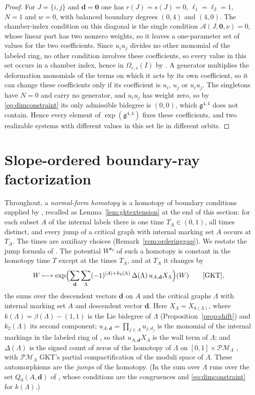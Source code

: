 \documentclass[11pt]{amsart}
\theoremstyle{definition}
\theoremstyle{remark}
\newcommand{\gfrak}{\mathfrak{g}}
\newcommand{\Ascr}{\mathcal{A}}
\newcommand{\Om}{\Omega_{r,s}}
\begin{document}
\begin{proof}
For $J=\{i,j\}$ and $\mathbf d=\mathbf 0$ one has $r(J)=s(J)=0$,
$\ell_1=\ell_2=1$, $N=1$ and $w=0$, with balanced boundary degrees $(0,4)$ and
$(4,0)$.  The chamber-index condition on this diagonal is the single condition
$\Ascr(J,\mathbf 0,\nu)=0$, whose linear part has two nonzero weights, so it
leaves a one-parameter set of values for the two coefficients.  Since
$u_iu_j$ divides no other monomial of the labeled ring, no other condition
involves these coefficients, so every value in this set occurs in a chamber index, hence
in $\Om(I)$ by \cite[Cor.~5.14]{GKT}.  A generator multiplies the deformation
monomials of the terms on which it acts by its own coefficient, so it can
change these coefficients only if its coefficient is $u_i$, $u_j$ or
$u_iu_j$.  The singletons have $N=0$ and carry no generator, and $u_iu_j$ has
weight zero, so by \eqref{eq:dimconstraint} its only admissible bidegree is
$(0,0)$, which $\gfrak^{4,4}$ does not contain.  Hence every element of
$\exp(\gfrak^{4,4})$ fixes these coefficients, and two realizable systems with
different values in this set lie in different orbits.
\end{proof}

\section{Slope-ordered boundary-ray factorization}
\label{sec:presentation}

Throughout, a \emph{normal-form homotopy} is a homotopy of boundary
conditions supplied by \cite[Lem.~3.40]{GKT}, recalled as
Lemma~\ref{lem:gktextension} at the end of this section: for each subset $A$ of the
internal labels there is one time $T_{A}\in(0,1)$, all times distinct, and
every jump of a critical graph with internal marking set $A$ occurs at
$T_{A}$. The times are auxiliary choices (Remark~\ref{rem:orderinggap}).
We restate the jump formula of \cite[proof of Thm.~5.9]{GKT}.  The potential
$W^{\mathfrak s_T}$ of such a homotopy is constant in the homotopy time $T$ except at the times $T_A$,
and at $T_A$ it changes by
\[
W\longmapsto\exp\Bigl(\sum_{\mathbf d}\sum_{\Lambda}
(-1)^{|A|+k_2(\Lambda)}\,\Delta(\Lambda)\,u_{A,\mathbf d}X_{\Lambda}\Bigr)(W)
\qquad\text{\cite[proof of Thm.~5.9]{GKT}},
\]
the sums over the descendent vectors $\mathbf d$ on $A$ and the critical graphs
$\Lambda$ with internal marking set $A$ and descendent vector $\mathbf d$.
Here $X_\Lambda=X_{k(\Lambda)}$, where $k(\Lambda)=\beta(\Lambda)-(1,1)$ is the
Lie bidegree of $\Lambda$ (Proposition~\ref{prop:shift}) and $k_2(\Lambda)$ its
second component; $u_{A,\mathbf d}=\prod_{j\in A}u_{j,d_j}$ is the monomial of
the internal markings in the labeled ring of \cite[Def.~4.6]{GKT}, so that
$u_{A,\mathbf d}X_\Lambda$ is the wall term of $\Lambda$; and $\Delta(\Lambda)$ is
the signed count of zeros of the homotopy of
$\Lambda$ on $[0,1]\times\mathcal{PM}_\Lambda$ \cite[(5.33)]{GKT}, with
$\mathcal{PM}_\Lambda$ GKT's partial compactification of the moduli space of
$\Lambda$.  These
automorphisms are the \emph{jumps} of the homotopy.  (In \cite{GKT} the sum
over $\Lambda$ runs over the set $Q_0(A,\mathbf d)$ of \cite[Not.~5.7]{GKT},
whose conditions are the congruences and \eqref{eq:dimconstraint} for
$k(\Lambda)$.)
\end{document}
